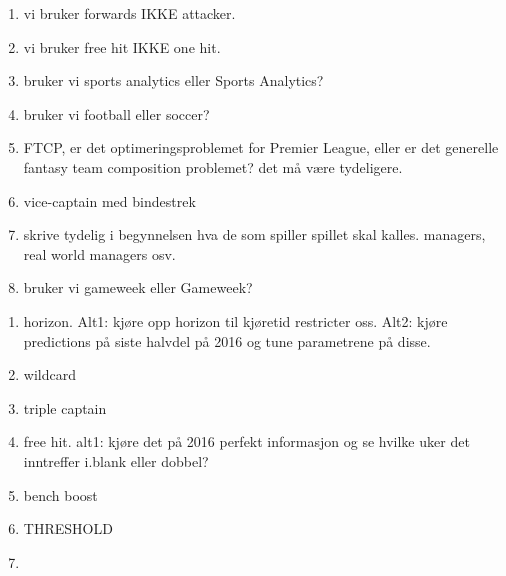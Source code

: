 \begin{enumerate}
    \item vi bruker forwards IKKE attacker. 
    \item vi bruker free hit IKKE one hit.
    \item bruker vi sports analytics eller Sports Analytics? 
    \item bruker vi football eller soccer? 
    \item FTCP, er det optimeringsproblemet for Premier League, eller er det generelle fantasy team composition problemet? det må være tydeligere. 
    \item vice-captain med bindestrek
    \item skrive tydelig i begynnelsen hva de som spiller spillet skal kalles. managers, real world managers osv.
    \item bruker vi gameweek eller Gameweek?
\end{enumerate}


\begin{enumerate}
    \item horizon. Alt1: kjøre opp horizon til kjøretid restricter oss. Alt2: kjøre predictions på siste halvdel på 2016 og tune parametrene på disse. 
    \item wildcard 
    \item triple captain 
    \item free hit. alt1: kjøre det på 2016 perfekt informasjon og se hvilke uker det inntreffer i.blank eller dobbel?  
    \item bench boost
    \item THRESHOLD
    \item 
\end{enumerate}